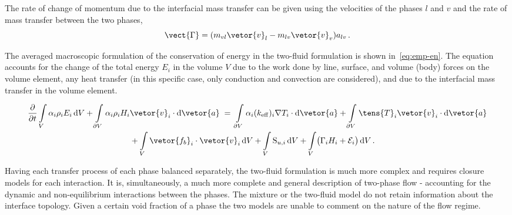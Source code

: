 The rate of change of momentum due to the 
 interfacial mass transfer can be given using the velocities of the phases $l$ and $v$ and the rate 
 of mass transfer between the two phases,
\begin{equation}
\vect{\Gamma} = (m_{vl}\vetor{v}_{l} - m_{lv}\vetor{v}_{v}) a_{lv}\,.
\end{equation}

The averaged macroscopic formulation of the conservation of energy in the two-fluid formulation is 
 shown in~\eqref{eq:emp-en}. The equation accounts for the change of the total energy $E_{i}$ in the 
 volume $V$ due to the work done by line, surface, and volume (body) forces on the volume element,
 any heat transfer (in this specific case, only conduction and convection are considered),
 and due to the interfacial mass transfer in the volume element. 
  
\begin{align}\label{eq:emp-en}
\frac{\partial}{\partial t}
\int\limits_{V} \alpha_{i} \rho_{i} E_{i} \,\mathrm{d}V
+ \int\limits_{\partial V} \alpha_{i} \rho_{i} H_{i}&
\vetor{v}_{i} \cdot \mathrm{d}\vetor{a}
\;=\;
\int\limits_{\partial V} \alpha_{i} (k_{\mathrm{eff}})_{i} \nabla T_{i} \cdot \mathrm{d}\vetor{a}
+ \int\limits_{\partial V} \tens{T}_{i} \vetor{v}_{i} \cdot \mathrm{d}\vetor{a}\nonumber \\
& + \int\limits_{V} \vetor{f_{b}}_{i} \cdot \vetor{v}_{i} \,\mathrm{d}V
+ \int\limits_{V} \mathrm{S}_{u,i} \,\mathrm{d}V + \int\limits_{V} \bigl(\Gamma_{i}H_{i} + \mathcal{E}_{i}\bigr)\,\mathrm{d}V\,.
\end{align} 


Having each transfer process of each phase balanced separately, 
 the two-fluid formulation is much more complex and requires closure models
 for each interaction. It is, simultaneously, a much more
 complete and general description of two-phase flow - accounting for the dynamic and non-equilibrium 
 interactions between the phases. The mixture or the two-fluid model do not retain information about the interface topology.
 Given a certain void fraction of a phase the two models are
 unable to comment on the nature of the flow regime.~\cite{ishiiThermoFluidDynamicsTwoPhase2011}